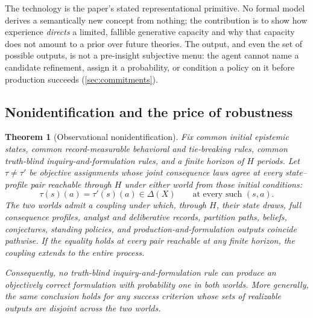 \documentclass[11pt]{article}
\newtheorem{theorem}[assumption]{Theorem}
\theoremstyle{definition}
\begin{document}
The technology is the paper's stated representational primitive.
No formal model derives a semantically new concept from nothing; the contribution is to show how experience \emph{directs} a limited, fallible generative capacity and why that capacity does not amount to a prior over future theories.
The output, and even the set of possible outputs, is not a pre-insight subjective menu: the agent cannot name a candidate refinement, assign it a probability, or condition a policy on it before production succeeds (\cref{sec:commitments}).

\subsection{Nonidentification and the price of robustness}

\begin{theorem}[Observational nonidentification]
\label{thm:nonidentification}
Fix common initial epistemic states, common record-measurable behavioral and tie-breaking rules, common truth-blind inquiry-and-formulation rules, and a finite horizon of $H$ periods.
Let $\tau\neq\tau'$ be objective assignments whose \emph{joint} consequence laws agree at every state--profile pair reachable through $H$ under either world from those initial conditions:
\[
\tau(s)(a)=\tau'(s)(a)\in\Delta(X)
\qquad
\text{at every such $(s,a)$.}
\]
The two worlds admit a coupling under which, through $H$, their state draws, full consequence profiles, analyst and deliberative records, partition paths, beliefs, conjectures, standing policies, and production-and-formulation outputs coincide pathwise.
If the equality holds at every pair reachable at any finite horizon, the coupling extends to the entire process.

Consequently, no truth-blind inquiry-and-formulation rule can produce an objectively correct formulation with probability one in both worlds.
More generally, the same conclusion holds for any success criterion whose sets of realizable outputs are disjoint across the two worlds.
\end{theorem}
\end{document}
